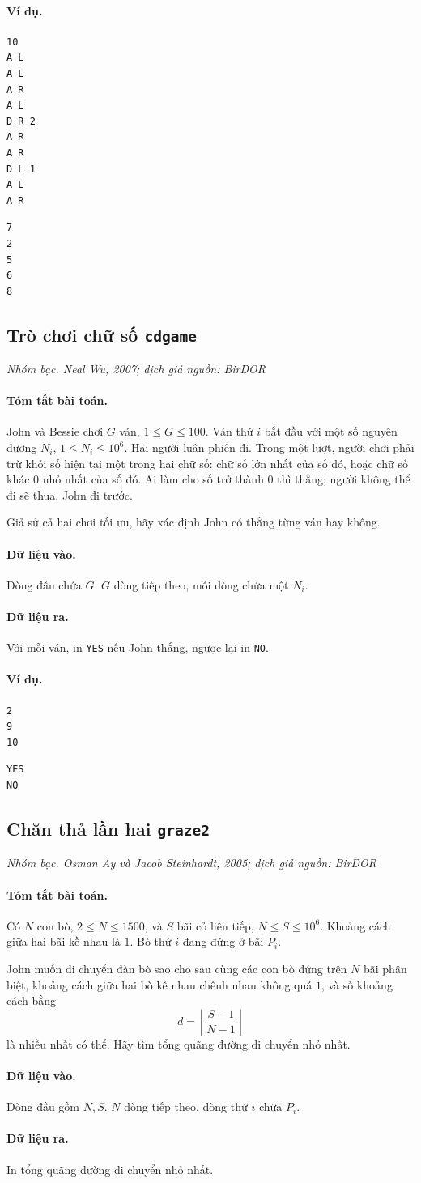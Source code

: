 \documentclass[11pt]{article}
\newcommand{\problem}[4]{%
  \subsection[#1 (#2)]{#1 \hfill {\normalsize\texttt{#2}}}%
  \noindent\textit{#3. #4}\par\smallskip
}
\newcommand{\iosec}[1]{\paragraph{#1}}
\begin{document}
\iosec{Ví dụ.}
\begin{verbatim}
10
A L
A L
A R
A L
D R 2
A R
A R
D L 1
A L
A R
\end{verbatim}

\begin{verbatim}
7
2
5
6
8
\end{verbatim}

\problem{Trò chơi chữ số}{cdgame}{Nhóm bạc}{Neal Wu, 2007; dịch giả nguồn: BirDOR}

\iosec{Tóm tắt bài toán.}
John và Bessie chơi \(G\) ván, \(1\le G\le 100\). Ván thứ \(i\) bắt đầu với
một số nguyên dương \(N_i\), \(1\le N_i\le 10^6\). Hai người luân phiên đi.
Trong một lượt, người chơi phải trừ khỏi số hiện tại một trong hai chữ số:
chữ số lớn nhất của số đó, hoặc chữ số khác \(0\) nhỏ nhất của số đó. Ai làm
cho số trở thành \(0\) thì thắng; người không thể đi sẽ thua. John đi trước.

Giả sử cả hai chơi tối ưu, hãy xác định John có thắng từng ván hay không.

\iosec{Dữ liệu vào.}
Dòng đầu chứa \(G\). \(G\) dòng tiếp theo, mỗi dòng chứa một \(N_i\).

\iosec{Dữ liệu ra.}
Với mỗi ván, in \texttt{YES} nếu John thắng, ngược lại in \texttt{NO}.

\iosec{Ví dụ.}
\begin{verbatim}
2
9
10
\end{verbatim}

\begin{verbatim}
YES
NO
\end{verbatim}

\problem{Chăn thả lần hai}{graze2}{Nhóm bạc}{Osman Ay và Jacob Steinhardt, 2005; dịch giả nguồn: BirDOR}

\iosec{Tóm tắt bài toán.}
Có \(N\) con bò, \(2\le N\le 1500\), và \(S\) bãi cỏ liên tiếp,
\(N\le S\le 10^6\). Khoảng cách giữa hai bãi kề nhau là \(1\). Bò thứ \(i\)
đang đứng ở bãi \(P_i\).

John muốn di chuyển đàn bò sao cho sau cùng các con bò đứng trên \(N\) bãi
phân biệt, khoảng cách giữa hai bò kề nhau chênh nhau không quá \(1\), và số
khoảng cách bằng
\[
d=\left\lfloor\frac{S-1}{N-1}\right\rfloor
\]
là nhiều nhất có thể. Hãy tìm tổng quãng đường di chuyển nhỏ nhất.

\iosec{Dữ liệu vào.}
Dòng đầu gồm \(N,S\). \(N\) dòng tiếp theo, dòng thứ \(i\) chứa \(P_i\).

\iosec{Dữ liệu ra.}
In tổng quãng đường di chuyển nhỏ nhất.
\end{document}
